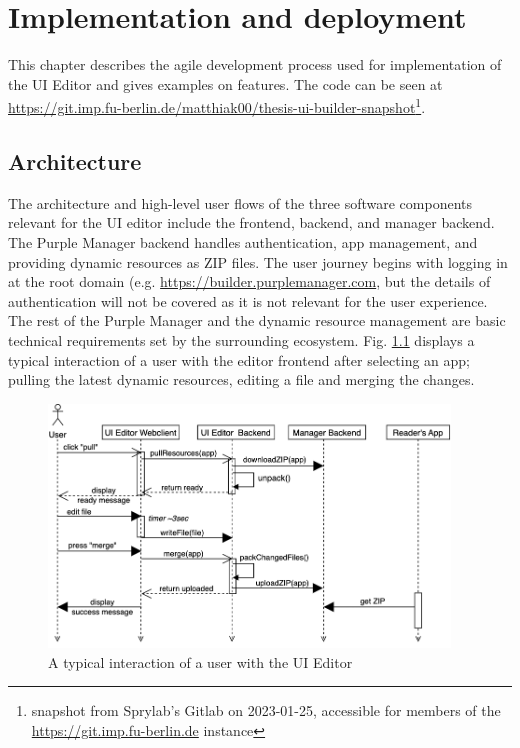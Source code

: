 
%
\chapter{Implementation and deployment}
\label{chap:impl} 

This chapter describes the agile development process used for implementation of the UI Editor and gives examples on features. The code can be seen at \url{https://git.imp.fu-berlin.de/matthiak00/thesis-ui-builder-snapshot}\footnote{snapshot from Sprylab's Gitlab on 2023-01-25, accessible for members of the \url{https://git.imp.fu-berlin.de} instance}.


\section{Architecture}

The architecture and high-level user flows of the three software components relevant for the UI editor include the frontend, backend, and \Gls{manager} backend. The Purple Manager backend handles authentication, app management, and providing dynamic resources as ZIP files. The user journey begins with logging in at the root domain (e.g. \url{https://builder.purplemanager.com}, but the details of authentication will not be covered as it is not relevant for the user experience. The \Gls{rest} of the Purple Manager and the dynamic resource management are basic technical requirements set by the surrounding ecosystem.
Fig. \ref{fig:userflow} displays a typical interaction of a user with the editor frontend after selecting an app; pulling the latest dynamic resources, editing a file and merging the changes.
\begin{figure}[h!]
  \centering
  \includegraphics[width=0.95\textwidth]{pics/user-flow.uml.drawio.png}
  \caption{A typical interaction of a user with the UI Editor}
  \label{fig:userflow}
\end{figure}
\pagebreak
